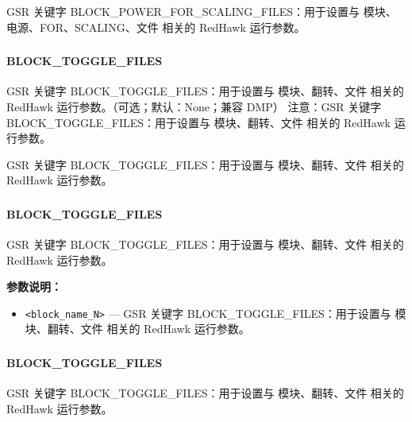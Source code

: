 GSR 关键字 BLOCK_POWER_FOR_SCALING_FILES：用于设置与 模块、电源、FOR、SCALING、文件 相关的 RedHawk 运行参数。

\subsubsection{}
\paragraph*{BLOCK_TOGGLE_FILES}

GSR 关键字 BLOCK_TOGGLE_FILES：用于设置与 模块、翻转、文件 相关的 RedHawk 运行参数。（可选；默认：None；兼容 DMP） 注意：GSR 关键字 BLOCK_TOGGLE_FILES：用于设置与 模块、翻转、文件 相关的 RedHawk 运行参数。

\begin{noteBox}
GSR 关键字 BLOCK\_TOGGLE\_FILES：用于设置与 模块、翻转、文件 相关的 RedHawk 运行参数。
\end{noteBox}

\subsubsection{}
\paragraph*{BLOCK_TOGGLE_FILES}

GSR 关键字 BLOCK_TOGGLE_FILES：用于设置与 模块、翻转、文件 相关的 RedHawk 运行参数。

\textbf{参数说明：}
\begin{itemize}
\item \texttt{<block\_name\_N>} — GSR 关键字 BLOCK\_TOGGLE\_FILES：用于设置与 模块、翻转、文件 相关的 RedHawk 运行参数。
\end{itemize}

\subsubsection{}
\paragraph*{BLOCK_TOGGLE_FILES}

GSR 关键字 BLOCK_TOGGLE_FILES：用于设置与 模块、翻转、文件 相关的 RedHawk 运行参数。

\subsubsection{}
